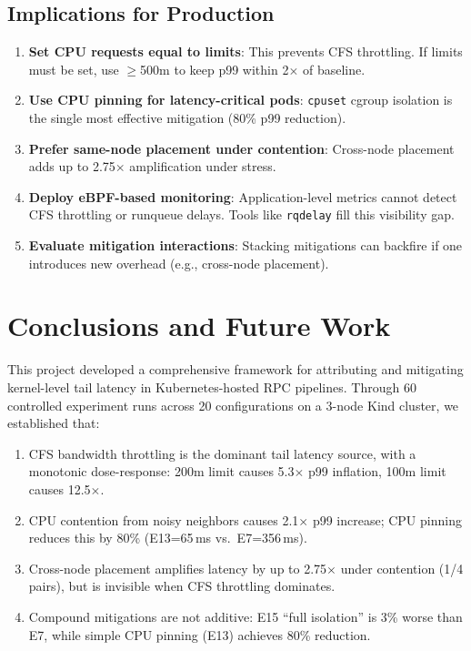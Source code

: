 \documentclass[11pt,a4paper]{article}
\begin{document}
\subsection{Implications for Production}

\begin{enumerate}[leftmargin=*]
  \item \textbf{Set CPU requests equal to limits}: This prevents CFS throttling. If limits must be set, use $\geq$500m to keep p99 within 2$\times$ of baseline.

  \item \textbf{Use CPU pinning for latency-critical pods}: \texttt{cpuset} cgroup isolation is the single most effective mitigation (80\% p99 reduction).

  \item \textbf{Prefer same-node placement under contention}: Cross-node placement adds up to 2.75$\times$ amplification under stress.

  \item \textbf{Deploy eBPF-based monitoring}: Application-level metrics cannot detect CFS throttling or runqueue delays. Tools like \texttt{rqdelay} fill this visibility gap.

  \item \textbf{Evaluate mitigation interactions}: Stacking mitigations can backfire if one introduces new overhead (e.g., cross-node placement).
\end{enumerate}


\section{Conclusions and Future Work}
\label{sec:conclusions}

This project developed a comprehensive framework for attributing and mitigating kernel-level tail latency in Kubernetes-hosted RPC pipelines. Through 60 controlled experiment runs across 20 configurations on a 3-node Kind cluster, we established that:

\begin{enumerate}[leftmargin=*]
  \item CFS bandwidth throttling is the dominant tail latency source, with a monotonic dose-response: 200m limit causes 5.3$\times$ p99 inflation, 100m limit causes 12.5$\times$.

  \item CPU contention from noisy neighbors causes 2.1$\times$ p99 increase; CPU pinning reduces this by 80\% (E13=65\,ms vs.\ E7=356\,ms).

  \item Cross-node placement amplifies latency by up to 2.75$\times$ under contention (1/4 pairs), but is invisible when CFS throttling dominates.

  \item Compound mitigations are not additive: E15 ``full isolation'' is 3\% worse than E7, while simple CPU pinning (E13) achieves 80\% reduction.
\end{enumerate}
\end{document}

